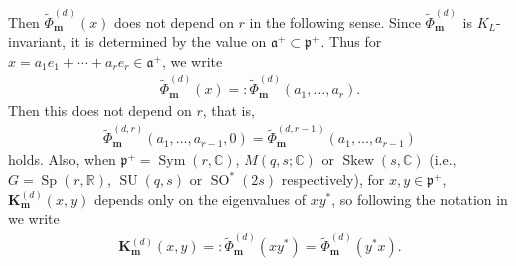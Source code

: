 \documentclass[11pt]{article}
\numberwithin{equation}{section}
\newcommand{\bK}{\mathbf{K}}
\newcommand{\bm}{\mathbf{m}}
\newcommand{\BR}{\mathbb{R}}
\newcommand{\BC}{\mathbb{C}}
\newcommand{\fa}{\mathfrak{a}}
\newcommand{\fp}{\mathfrak{p}}
\newcommand{\Sym}{\operatorname{Sym}}
\newcommand{\Skew}{\operatorname{Skew}}
\begin{document}
Then $\tilde{\Phi}_\bm^{(d)}(x)$ does not depend on $r$ in the following sense.
Since $\tilde{\Phi}_\bm^{(d)}$ is $K_L$-invariant, it is determined by the value on $\fa^+\subset\fp^+$.
Thus for $x=a_1e_1+\cdots+a_re_r\in\fa^+$, we write
\begin{gather*} \tilde{\Phi}_\bm^{(d)}(x)=:\tilde{\Phi}_\bm^{(d)}(a_1,\ldots,a_r). \end{gather*}
Then this does not depend on $r$, that is,
\begin{gather*} \tilde{\Phi}_\bm^{(d,r)}(a_1,\ldots,a_{r-1},0)=\tilde{\Phi}_\bm^{(d,r-1)}(a_1,\ldots,a_{r-1}) \end{gather*}
holds. Also, when $\fp^+=\Sym(r,\BC)$, $M(q,s;\BC)$ or $\Skew(s,\BC)$ (i.e., $G=\operatorname{Sp}(r,\BR)$, $\operatorname{SU}(q,s)$ or $\operatorname{SO}^*(2s)$ respectively),
for $x,y\in\fp^+$, $\bK_\bm^{(d)}(x,y)$ depends only on the eigenvalues of $xy^*$, so following the notation in \cite{M} we write
\begin{gather}\label{Phitilde2}
\bK_\bm^{(d)}(x,y)=:\tilde{\Phi}_\bm^{(d)}(xy^*)=\tilde{\Phi}_\bm^{(d)}(y^*x).
\end{gather}
\end{document}
